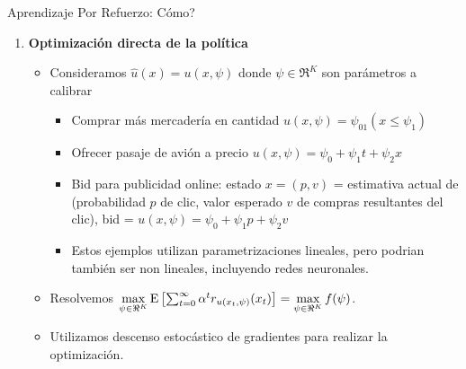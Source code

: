 \documentclass[handout]{beamer}
\begin{document}
\begin{frame}{Aprendizaje Por Refuerzo: Cómo?}
\begin{enumerate}
\item \textbf{Optimización directa de la política} 
\begin{itemize}
\item<2-> Consideramos $\hat u(x) = u(x,\psi)$ donde $\psi \in \Re^K$ son parámetros a calibrar
\begin{itemize}
\item<2-> Comprar más mercadería en cantidad $u(x,\psi) =\psi_01(x\leq \psi_1)$
\item<3-> Ofrecer pasaje de avión a precio $u(x,\psi) =\psi_0+\psi_1 t +\psi_2 x$
\item<4-> Bid para publicidad online: estado $x=(p,v)$ = estimativa actual de (probabilidad $p$ de clic, valor esperado $v$ de compras resultantes del clic), bid = $u(x,\psi) = \psi_0+\psi_1 p +\psi_2 v$
\item<5-> Estos ejemplos utilizan parametrizaciones lineales, pero podrian también ser non lineales, incluyendo redes neuronales.
\end{itemize}
\item<3-> Resolvemos $\max\limits_{\psi \in \Re^K} {\rm E}\left[\sum_{t=0}^\infty \alpha^t r_{u(x_t,\psi)}(x_t)\right] = \max\limits_{\psi \in \Re^K} f(\psi)$.
\item<4-> Utilizamos descenso estocástico de gradientes para realizar la optimización.
\end{itemize}
\end{enumerate}
\end{frame}
\end{document}
